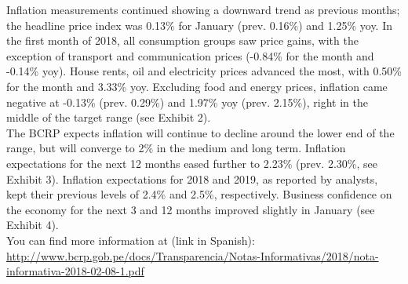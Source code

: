\documentclass[final,a4paper]{report}
\begin{document}
\begin{vwcol}[widths={0.45,0.55},
 sep=.5cm, justify=flush,rule=0pt,indent=0em]
\begin{minipage}{0.52\textwidth}
{Inflation measurements continued showing a downward trend as previous months; the headline price index was 0.13\% for January (prev. 0.16\%) and 1.25\% yoy. In the first month of 2018, all consumption groups saw price gains, with the exception of transport and communication prices (-0.84\% for the month and -0.14\% yoy). House rents, oil and electricity prices advanced the most, with 0.50\% for the month and 3.33\% yoy. Excluding food and energy prices, inflation came negative at -0.13\% (prev. 0.29\%) and 1.97\% yoy (prev. 2.15\%), right in the middle of the target range (see Exhibit 2).\\

The BCRP expects inflation will continue to decline around the lower end of the range, but will converge to 2\% in the medium and long term. Inflation expectations for the next 12 months eased further to 2.23\% (prev. 2.30\%, see Exhibit 3). Inflation expectations for 2018 and 2019, as reported by analysts, kept their previous levels of 2.4\% and 2.5\%, respectively. Business confidence on the economy for the next 3 and 12 months improved slightly in January (see Exhibit 4).\\

You can find more information at (link in Spanish):\\
\href{http://www.bcrp.gob.pe/docs/Transparencia/Notas-Informativas/2018/nota-informativa-2018-02-08-1.pdf}{http://www.bcrp.gob.pe/docs/Transparencia/Notas-Informativas/2018/nota-informativa-2018-02-08-1.pdf}
}
	\end{minipage} %
\end{vwcol}
	
\thispagestyle{firststyle}

	\newpage
	
\thispagestyle{main}
	
		
		

\end{document}
